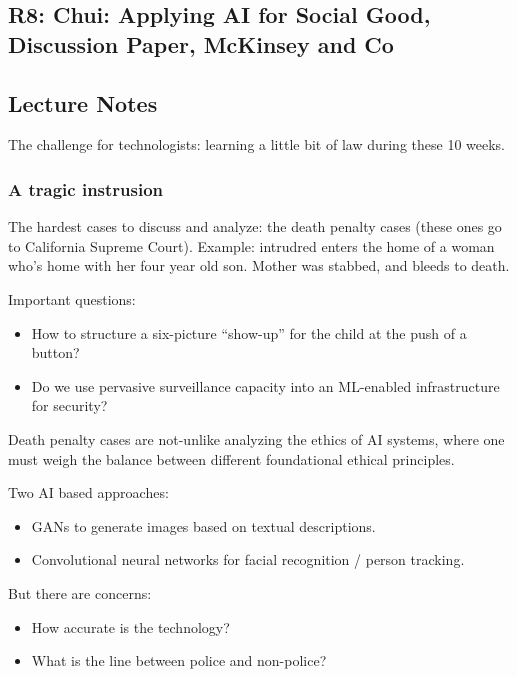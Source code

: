 \documentclass{article}
\begin{document}
\subsection{R8: Chui: Applying AI for Social Good, Discussion Paper, McKinsey and Co}

\subsection{Lecture Notes}

The challenge for technologists: learning a little bit of law during these 10 weeks.

\subsubsection{A tragic instrusion}

The hardest cases to discuss and analyze: the death penalty cases (these ones go to California Supreme Court).  Example: intrudred enters the home of a woman who's home with her four year old son.  Mother was stabbed, and bleeds to death.

Important questions:

\begin{itemize}
  \item How to structure a six-picture ``show-up'' for the child at the push of a button?
  \item Do we use pervasive surveillance capacity into an ML-enabled infrastructure for security?
\end{itemize}

Death penalty cases are not-unlike analyzing the ethics of AI systems, where one must weigh the balance between different foundational ethical principles.

Two AI based approaches:
\begin{itemize}
  \item GANs to generate images based on textual descriptions.
  \item Convolutional neural networks for facial recognition / person tracking. 
\end{itemize}

But there are concerns:
\begin{itemize}
  \item How accurate is the technology?
  \item What is the line between police and non-police?
\end{itemize}
\end{document}
